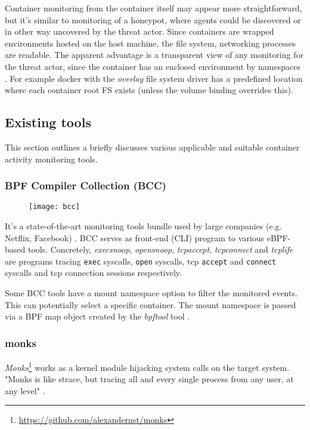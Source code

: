 Container monitoring from the container itself may appear more straightforward, but it's similar to monitoring of a honeypot, where agents could be discovered or in other way uncovered by the threat actor. Since containers are wrapped environments hosted on the host machine, the file system, networking processes are readable. The apparent advantage is a transparent view of any monitoring for the threat actor, since the container has an enclosed environment by namespaces \cite{blog:containers}. For example docker with the \textit{overlay} file system driver has a predefined location where each container root FS exists (unless the volume binding overrides this).

\subsection{Existing tools \label{anal:mon:exist}}
This section outlines a briefly discusses various applicable and suitable container activity monitoring tools.

\subsubsection*{BPF Compiler Collection (BCC)}
\begin{figure}[h]
	\centering
	\texttt{[image: bcc]}
	\caption{}
	\label{image:anal:mon:bcc}
\end{figure}
It's a state-of-the-art monitoring tools bundle used by large companies (e.g. Netflix, Facebook) \cite{blog:bcc}. BCC serves as front-end (CLI) program to various eBPF-based tools. Concretely, \textit{execsnoop}, \textit{opensnoop}, \textit{tcpaccept}, \textit{tcpconnect} and \textit{tcplife} are programs tracing \texttt{exec} syscalls, \texttt{open} syscalls, tcp \texttt{accept} and \texttt{connect} syscalls and tcp connection sessions respectively.

Some BCC tools have a mount namespace option to filter the monitored events. This can potentially select a specific container. The mount namespace is passed via a BPF map object created by the \textit{bpftool} tool \cite{git:bcc:mntns}.

\subsubsection*{monks}
\textit{Monks}\footnote{\url{https://github.com/alexandernst/monks}} works as a kernel module hijacking system calls on the target system. "Monks is like strace, but tracing all and every single process from any user, at any level" \cite{git:monks}.

